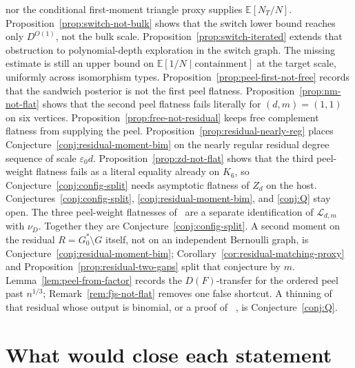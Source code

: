 \documentclass[11pt]{article}
\newcommand{\EE}{\mathbb{E}}
\begin{document}
nor the conditional first-moment triangle proxy supplies \(\EE[N_T/N]\).
Proposition~\ref{prop:switch-not-bulk} shows that the switch lower bound
reaches only \(D^{O(1)}\), not the bulk scale.
Proposition~\ref{prop:switch-iterated} extends that obstruction to
polynomial-depth exploration in the switch graph.
The missing estimate is still an upper bound on \(\EE[1/N\mid\text{containment}]\)
at the target scale, uniformly across isomorphism types.
Proposition~\ref{prop:peel-first-not-free} records that the sandwich posterior
is not the first peel flatness.
Proposition~\ref{prop:nm-not-flat} shows that the second peel flatness fails
literally for \((d,m)=(1,1)\) on six vertices.
Proposition~\ref{prop:free-not-residual} keeps free complement flatness from
supplying the peel.
Proposition~\ref{prop:residual-nearly-reg} places Conjecture~\ref{conj:residual-moment-bim}
on the nearly regular residual degree sequence of scale \(\varepsilon_0 d\).
Proposition~\ref{prop:zd-not-flat} shows that the third peel-weight flatness
fails as a literal equality already on \(K_6\), so Conjecture~\ref{conj:config-split}
needs asymptotic flatness of \(Z_d\) on the host.
Conjectures~\ref{conj:config-split}, \ref{conj:residual-moment-bim}, and
\ref{conj:Q} stay open.
The three peel-weight flatnesses of~\cite{PlusOneV1} are a separate
identification of \(\mathcal{L}_{d,m}\) with \(\nu_D\).
Together they are Conjecture~\ref{conj:config-split}.
A second moment on the residual \(R=G^*_0\setminus G\) itself, not on an
independent Bernoulli graph, is Conjecture~\ref{conj:residual-moment-bim};
Corollary~\ref{cor:residual-matching-proxy} and
Proposition~\ref{prop:residual-two-gaps} split that conjecture by \(m\).
Lemma~\ref{lem:peel-from-factor} records the \(D(F)\)-transfer for the ordered
peel past \(n^{1/3}\); Remark~\ref{rem:fjs-not-flat} removes one false shortcut.
A thinning of that residual whose output is binomial, or a proof of
~\cite[Conjecture~1.3]{BIM25}, is Conjecture~\ref{conj:Q}.

\section{What would close each statement}
\end{document}
